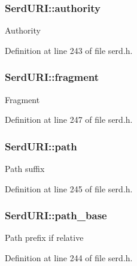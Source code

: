 \subsubsection[{\texorpdfstring{authority}{authority}}]{ Serd\+U\+R\+I\+::authority}\hypertarget{struct_serd_u_r_i_a8e5ad5cdcf67e04b5704d879c17d8f78}{}\label{struct_serd_u_r_i_a8e5ad5cdcf67e04b5704d879c17d8f78}
Authority 

Definition at line 243 of file serd.\+h.

\subsubsection[{\texorpdfstring{fragment}{fragment}}]{ Serd\+U\+R\+I\+::fragment}\hypertarget{struct_serd_u_r_i_ab9e639a2f3c0183c4c8d0b44dc22a00a}{}\label{struct_serd_u_r_i_ab9e639a2f3c0183c4c8d0b44dc22a00a}
Fragment 

Definition at line 247 of file serd.\+h.

\subsubsection[{\texorpdfstring{path}{path}}]{ Serd\+U\+R\+I\+::path}\hypertarget{struct_serd_u_r_i_a70b1052b735a7b0b602bce0398e2ad96}{}\label{struct_serd_u_r_i_a70b1052b735a7b0b602bce0398e2ad96}
Path suffix 

Definition at line 245 of file serd.\+h.

\subsubsection[{\texorpdfstring{path\+\_\+base}{path_base}}]{ Serd\+U\+R\+I\+::path\+\_\+base}\hypertarget{struct_serd_u_r_i_a127adf8cc7c49ef5dd5cb2f2064c08ef}{}\label{struct_serd_u_r_i_a127adf8cc7c49ef5dd5cb2f2064c08ef}
Path prefix if relative 

Definition at line 244 of file serd.\+h.


